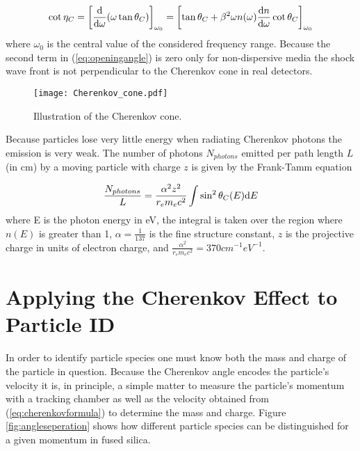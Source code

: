 \begin{equation}
	\cot\eta_C = \left[\frac{\mathrm{d}}{\mathrm{d}\omega}(\omega \tan\theta_{C}) \right]_{\omega_0} = \left[\tan\theta_{C} + \beta^2\omega n(\omega) \frac{\mathrm{d} n}{\mathrm{d}\omega}\cot\theta_{C} \right]_{\omega_0}
	\label{eq:openingangle}
\end{equation}
where $\omega_0$ is the central value of the considered frequency range. Because the second term in (\ref{eq:openingangle}) is zero only for non-dispersive media the shock wave front is not perpendicular to the Cherenkov cone in real detectors.

\begin{figure}[!htb]
	\centering
	\texttt{[image: Cherenkov\_cone.pdf]}
	\caption{Illustration of the Cherenkov cone.}
	\label{fig:cherenkovcone}
\end{figure}

Because particles lose very little energy when radiating Cherenkov photons the emission is very weak. The number of photons $N_{photons}$ emitted per path length $L$ (in cm) by a moving particle with charge $z$ is given by the Frank-Tamm equation

\begin{equation}
	\frac{N_{photons}}{L} = \frac{\alpha^2 z^2}{r_e m_e c^2} \int \sin^2\theta_{C} (E) \mathrm{d} E
	\label{eq:nphotons}
\end{equation}
%
where E is the photon energy in eV, the integral is taken over the region where $n(E)$ is greater than 1, $\alpha = \frac{1}{137}$ is the fine structure constant, $z$ is the projective charge in units of electron charge, and $\frac{\alpha^2}{r_e m_e c^2} = 370\unit{cm}^{-1}\unit{eV}^{-1}$.

\section{Applying the Cherenkov Effect to Particle ID}
In order to identify particle species one must know both the mass and charge of the particle in question. Because the Cherenkov angle encodes the particle's velocity it is, in principle, a simple matter to measure the particle's momentum with a tracking chamber as well as the velocity obtained from (\ref{eq:cherenkovformula}) to determine the mass and charge. Figure \ref{fig:angleseperation} shows how different particle species can be distinguished for a given momentum in fused silica.

